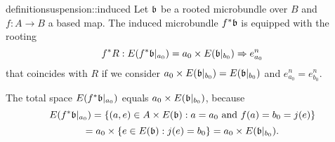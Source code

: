 \begin{mystatement}{definition}{suspension::induced}
    Let $\bb$ be a rooted microbundle over $B$ and $f: A \to B$ a based map.
    The induced microbundle $\ind{f}\bb$ is equipped with the rooting
    \[
        \germdef{\ind{f}R}{E(\ind{f}\bb[a_0])
        = a_0 \cross E(\bb[b_0])}{e^n_{a_0}}
    \]
    that coincides with $R$ if we consider
    $a_0 \cross E(\bb[b_0]) = E(\bb[b_0])$ and $e^n_{a_0} = e^n_{b_0}$.
\end{mystatement}

\begin{myparagraph}
    The total space $E(\ind{f}\bb[a_0])$ equals $a_0 \cross E(\bbb)$, because
    \[
        E(\ind{f}\bb[a_0])
        = \set{(a, e) \in A \cross E(\bb)}{a = a_0 \tand f(a) = b_0 = j(e)}
    \]
    \[
        = a_0 \cross \set{e \in E(\bb)}{j(e) = b_0}
        = a_0 \cross E(\bbb).
    \]
\end{myparagraph}